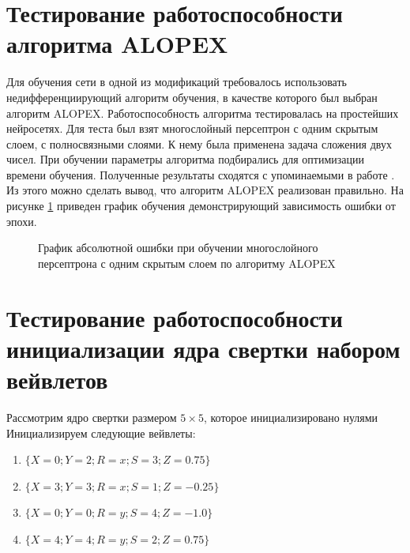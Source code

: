 \documentclass[utf8,usehyperref,14pt]{G7-32}
\begin{document}
\section{Тестирование работоспособности алгоритма ALOPEX}
Для обучения сети в одной из модификаций требовалось использовать недифференциирующий алгоритм обучения, в качестве которого был выбран алгоритм ALOPEX. Работоспособность алгоритма тестировалась на простейших нейросетях. Для теста был взят многослойный персептрон с одним скрытым слоем, с полносвязными слоями. К нему была применена задача сложения двух чисел. При обучении параметры алгоритма подбирались для оптимизации времени обучения. Полученные результаты сходятся с упоминаемыми в работе \cite{carlo_alopex}. Из этого можно сделать вывод, что алгоритм ALOPEX реализован правильно.  На рисунке \ref{ALOPEX_test} приведен график обучения демонстрирующий зависимость ошибки от эпохи.
\begin{figure}[H]
  \caption{График абсолютной ошибки при обучении многослойного персептрона с одним скрытым слоем по алгоритму ALOPEX}\label{ALOPEX_test}
\end{figure}

\section{Тестирование работоспособности инициализации ядра свертки набором вейвлетов}
Рассмотрим ядро свертки размером $ 5 \times 5 $, которое инициализировано нулями
Инициализируем следующие вейвлеты:
\begin{enumerate}
\item $\{X=0; Y=2; R=x; S=3; Z=0.75\}$
\item $\{X=3; Y=3; R=x; S=1; Z=-0.25\}$
\item $\{X=0; Y=0; R=y; S=4; Z=-1.0\}$
\item $\{X=4; Y=4; R=y; S=2; Z=0.75\}$
\end{enumerate}
\end{document}
